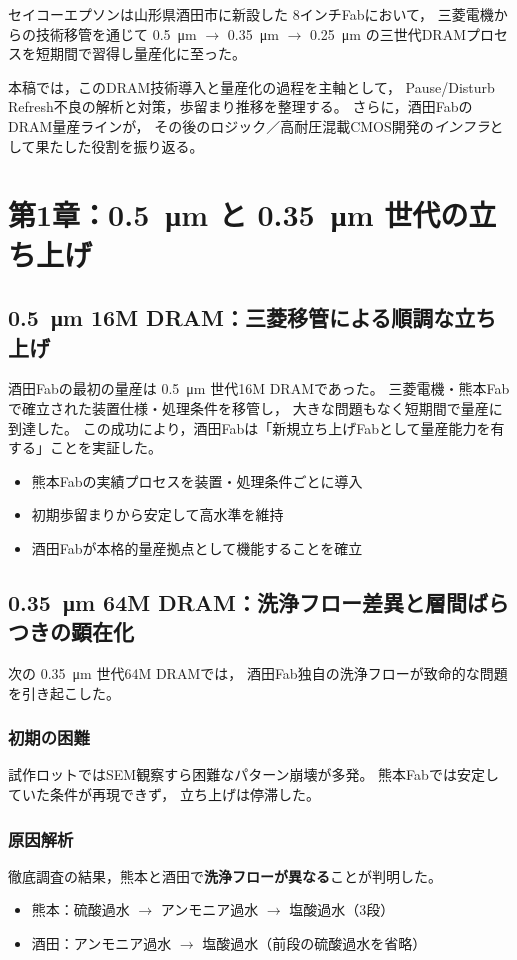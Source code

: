 \documentclass[conference]{IEEEtran}
\let\meter\metre
\begin{document}
セイコーエプソンは山形県酒田市に新設した 8インチFabにおいて，
三菱電機からの技術移管を通じて
\SI{0.5}{\micro\meter} $\rightarrow$ \SI{0.35}{\micro\meter} $\rightarrow$ \SI{0.25}{\micro\meter}
の三世代DRAMプロセスを短期間で習得し量産化に至った。

本稿では，このDRAM技術導入と量産化の過程を主軸として，
Pause/Disturb Refresh不良の解析と対策，歩留まり推移を整理する。
さらに，酒田FabのDRAM量産ラインが，
その後のロジック／高耐圧混載CMOS開発の\emph{インフラ}として果たした役割を振り返る。

\section{第1章：\texorpdfstring{\SI{0.5}{\micro\meter}}{0.5µm} と 
\texorpdfstring{\SI{0.35}{\micro\meter}}{0.35µm} 世代の立ち上げ}

\subsection{\SI{0.5}{\micro\meter} 16M DRAM：三菱移管による順調な立ち上げ}
酒田Fabの最初の量産は \SI{0.5}{\micro\meter} 世代16M DRAMであった。
三菱電機・熊本Fabで確立された装置仕様・処理条件を移管し，
大きな問題もなく短期間で量産に到達した。
この成功により，酒田Fabは「新規立ち上げFabとして量産能力を有する」ことを実証した。

\begin{itemize}
  \item 熊本Fabの実績プロセスを装置・処理条件ごとに導入
  \item 初期歩留まりから安定して高水準を維持
  \item 酒田Fabが本格的量産拠点として機能することを確立
\end{itemize}

\subsection{\SI{0.35}{\micro\meter} 64M DRAM：洗浄フロー差異と層間ばらつきの顕在化}
次の \SI{0.35}{\micro\meter} 世代64M DRAMでは，
酒田Fab独自の洗浄フローが致命的な問題を引き起こした。

\subsubsection*{初期の困難}
試作ロットではSEM観察すら困難なパターン崩壊が多発。
熊本Fabでは安定していた条件が再現できず，
立ち上げは停滞した。

\subsubsection*{原因解析}
徹底調査の結果，熊本と酒田で\textbf{洗浄フローが異なる}ことが判明した。
\begin{itemize}
  \item 熊本：硫酸過水 $\rightarrow$ アンモニア過水 $\rightarrow$ 塩酸過水（3段）
  \item 酒田：アンモニア過水 $\rightarrow$ 塩酸過水（前段の硫酸過水を省略）
\end{itemize}
\end{document}
